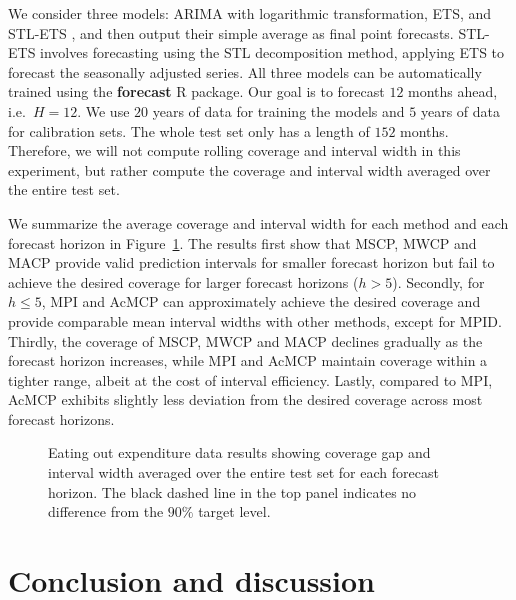 \documentclass[
  11pt,
  a4paper,
]{article}
\theoremstyle{plain}
\theoremstyle{remark}
\begin{document}
We consider three models: ARIMA with logarithmic transformation, ETS,
and STL-ETS \autocite{hyndman2021}, and then output their simple average
as final point forecasts. STL-ETS involves forecasting using the STL
decomposition method, applying ETS to forecast the seasonally adjusted
series. All three models can be automatically trained using the
\textbf{forecast} R package. Our goal is to forecast \(12\) months
ahead, i.e.~\(H=12\). We use \(20\) years of data for training the
models and \(5\) years of data for calibration sets. The whole test set
only has a length of \(152\) months. Therefore, we will not compute
rolling coverage and interval width in this experiment, but rather
compute the coverage and interval width averaged over the entire test
set.

We summarize the average coverage and interval width for each method and
each forecast horizon in Figure~\ref{fig-cafe_cov}. The results first
show that MSCP, MWCP and MACP provide valid prediction intervals for
smaller forecast horizon but fail to achieve the desired coverage for
larger forecast horizons (\(h>5\)). Secondly, for \(h \leq 5\), MPI and
AcMCP can approximately achieve the desired coverage and provide
comparable mean interval widths with other methods, except for MPID.
Thirdly, the coverage of MSCP, MWCP and MACP declines gradually as the
forecast horizon increases, while MPI and AcMCP maintain coverage within
a tighter range, albeit at the cost of interval efficiency. Lastly,
compared to MPI, AcMCP exhibits slightly less deviation from the desired
coverage across most forecast horizons.

\begin{figure}


\caption{\label{fig-cafe_cov}Eating out expenditure data results showing
coverage gap and interval width averaged over the entire test set for
each forecast horizon. The black dashed line in the top panel indicates
no difference from the \(90\%\) target level.}

\end{figure}%

\section{Conclusion and discussion}\label{conclusion-and-discussion}
\end{document}
